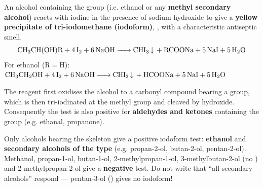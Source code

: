 \documentclass[11pt]{article}
\newcounter{popsec}
\newcounter{popsub}
\newcommand{\courssub}[1]{%
  \stepcounter{popsub}%
  \par\vspace{9pt}\noindent{\popxbold\fontsize{11.5}{13}\selectfont\color{popink}{\color{poporange}\thepopsec.\thepopsub}\hspace{6pt}#1}\par\nopagebreak\vspace{4pt}
}
\begin{document}
\courssub{The Iodoform Test}

\begin{definition}
An alcohol containing the group  (i.e. ethanol or any \textbf{methyl secondary alcohol}) reacts with iodine in the presence of sodium hydroxide to give a \textbf{yellow precipitate of tri-iodomethane (iodoform)}, , with a characteristic antiseptic smell.
\[ \ce{CH3CH(OH)R + 4I2 + 6NaOH -> CHI3 v + RCOONa + 5NaI + 5H2O} \]
For ethanol ($\mathrm{R = H}$): \quad $\ce{CH3CH2OH + 4I2 + 6NaOH -> CHI3 v + HCOONa + 5NaI + 5H2O}$
\end{definition}

The reagent first oxidises the alcohol to a carbonyl compound bearing a  group, which is then tri-iodinated at the methyl group and cleaved by hydroxide. Consequently the test is also positive for \textbf{aldehydes and ketones} containing the  group (e.g. ethanal, propanone).

\begin{attention}
Only alcohols bearing the  skeleton give a positive iodoform test: \textbf{ethanol} and \textbf{secondary alcohols of the type } (e.g. propan-2-ol, butan-2-ol, pentan-2-ol). Methanol, propan-1-ol, butan-1-ol, 2-methylpropan-1-ol, 3-methylbutan-2-ol (no ) and 2-methylpropan-2-ol give a \textbf{negative} test. Do not write that ``all secondary alcohols'' respond — pentan-3-ol () gives no iodoform!
\end{attention}
\end{document}

